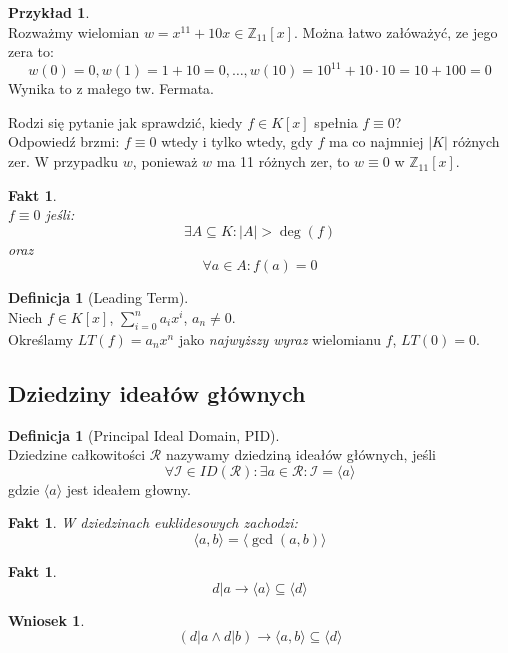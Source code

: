 \documentclass[11pt,a4paper]{article}
\newtheorem{fakt}[twierdzenie]{Fakt}
\newtheorem{wniosek}[twierdzenie]{Wniosek}
\theoremstyle{definition}
\newtheorem{definicja}[twierdzenie]{Definicja}
\newtheorem{przyklad}[twierdzenie]{Przykład}
\theoremstyle{remark}
\begin{document}
\begin{przyklad}~\\
    Rozważmy wielomian $w = x^{11}+10x \in \mathbb{Z}_{11}[x]$. Można łatwo załóważyć, ze jego zera to:
    \[
        w(0) = 0, w(1) = 1 + 10 = 0, \dots, w(10) = 10^{11} + 10 \cdot 10 = 10 + 100 = 0
    \]
    Wynika to z małego tw. Fermata.
\end{przyklad} 
Rodzi się pytanie jak sprawdzić, kiedy $f \in K[x]$ spełnia $f \equiv 0$?\\
Odpowiedź brzmi: $f \equiv 0$ wtedy i tylko wtedy, gdy $f$ ma co najmniej $|K|$ różnych zer. W przypadku $w$, ponieważ $w$ ma 11 różnych zer, to $w \equiv 0$ w $\mathbb{Z}_{11}[x]$.
\begin{fakt}~\\
    $f \equiv 0$ jeśli:
    \[
        \exists A \subseteq K: |A| > \deg(f) 
    \]
    oraz
    \[
    \forall a \in A: f(a) = 0
    \]
\end{fakt}
\begin{definicja}[Leading Term]~\\
    Niech $f \in K[x]$, $\sum_{i=0}^n a_i x^i$, $a_n \neq 0$. \\
    Określamy $LT(f) = a_n x^n$ jako \textit{najwyższy wyraz} wielomianu $f$, $LT(0) = 0$.
\end{definicja}
\subsection{Dziedziny ideałów głównych}
\begin{definicja}[Principal Ideal Domain, PID]~\\
    Dziedzine całkowitości $\mathcal{R}$ nazywamy dziedziną ideałów głównych, jeśli
    \[
        \forall \mathcal{I} \in ID(\mathcal{R}): \exists a \in \mathcal{R}: \mathcal{I} = \langle a \rangle
    \]
    gdzie $\langle a \rangle$ jest ideałem głowny.
\end{definicja}
\begin{fakt}
    W dziedzinach euklidesowych zachodzi:
    \[
        \langle a,b \rangle = \langle \gcd(a, b) \rangle
    \]
\end{fakt}
\begin{fakt}
    \[
        d|a \rightarrow \langle a \rangle \subseteq \langle d \rangle
    \]
\end{fakt}
\begin{wniosek}
    \[
        (d|a \land d|b) \rightarrow \langle a, b \rangle \subseteq \langle d \rangle
    \]
\end{wniosek}
\end{document}
